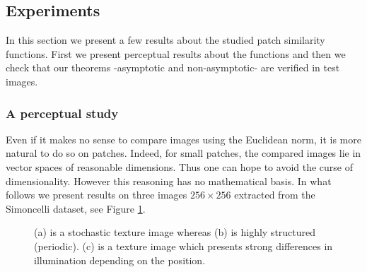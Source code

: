 
\subsection{Experiments}
In this section we present a few results about the studied patch similarity functions. First we present perceptual results about the functions and then we check that our theorems -asymptotic and non-asymptotic- are verified in test images.


\subsubsection{A perceptual study}
\label{s:a_perceptual_study}
Even if it makes no sense to compare images using the Euclidean norm, it is more natural to do so on patches. Indeed, for small patches, the compared images lie in vector spaces of reasonable dimensions. Thus one can hope to avoid the curse of dimensionality. However this reasoning has no mathematical basis. In what follows we present results on three images $256\times 256$ extracted from the Simoncelli dataset, see Figure \ref{fig:textures}.
\begin{figure}[h]
  \centering
   \hfill
   \hfill
   \hfill
  \caption{(a) is a stochastic texture image whereas (b) is highly structured (periodic). (c) is a texture image which presents strong differences in illumination depending on the position.}
  \label{fig:textures}
\end{figure}
\captionsetup[subfigure]{labelformat=empty}
